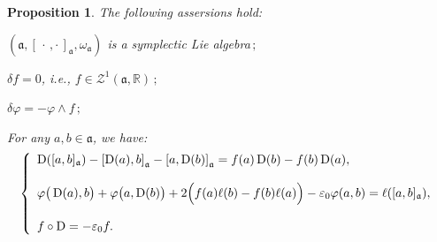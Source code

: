 \documentclass[final,1p,times,nopreprintline]{elsarticle}
\newtheorem{proposition}{Proposition}[section]
\theoremstyle{definition}
\numberwithin{equation}{section}
\newcommand{\ro}{\circ}
\newcommand{\rel}{\mathbb{R}}
\newcommand{\w}{\omega}
\newcommand{\ai}{\mathfrak{a}}
\numberwithin{equation}{section}
\newcommand{\D}{\operatorname{D}}
\begin{document}
\begin{proposition}\label{propCondDoublExtDim1}
	The following assersions hold:\vspace{1mm}
	\item[$1.$] $(\ai,[\,\cdot\,,\cdot\,]_\ai,\w_\ai)$ is a symplectic Lie algebra$\,;$\vspace{1mm}
	\item[$2.$] $\delta f=0$, i.e., $f\in\mathcal{Z}^1(\ai,\rel)\,;$\vspace{1mm}
	\item[$3.$] $\delta\varphi=-\varphi\wedge f\,;$\vspace{1mm}
	\item[$4.$] For any $a,b\in\ai$, we have:
	\begin{equation}\label{LiealG}
		\left\{
		\begin{array}{r c l}
			\D([a,b]_\ai)-\left[\D(a),b\right]_\ai-\left[a,\D(b)\right]_\ai=f(a)\D(b)-f(b)\D(a),\hfill\hfill\\\\
			\varphi\big(\D(a),b\big)+\varphi\big(a,\D(b)\big)+2\Big(f(a)\ell(b)-f(b)\ell(a)\Big)-\varepsilon_0\varphi(a,b)=\ell([a,b]_\ai),\hfill\hfill\\\\
			f\ro \D=-\varepsilon_0f.\hfill\hfill\hfill\hfill
		\end{array}
		\right.\\
	\end{equation}
\end{proposition}
\end{document}
